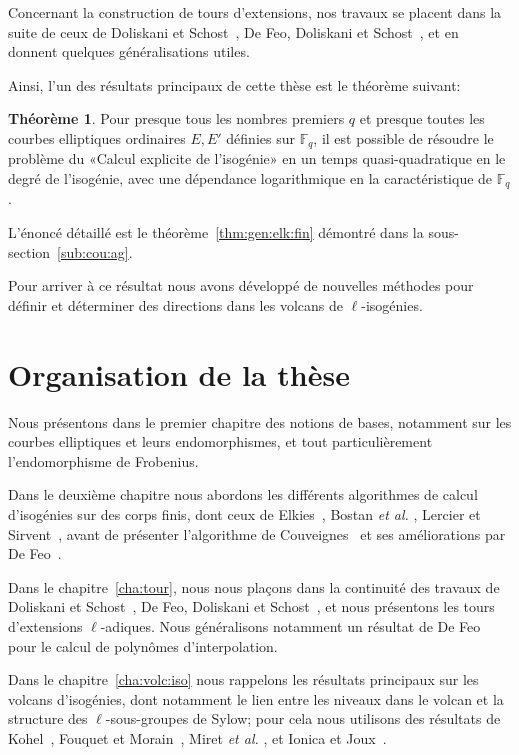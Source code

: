 \documentclass[10pt,a4paper]{book}
\theoremstyle{plain}
\theoremstyle{definition}
\newtheorem*{thm*}{Théorème}
\theoremstyle{definition}
\theoremstyle{definition}
\theoremstyle{definition}
\theoremstyle{definition}
\theoremstyle{remark}
\theoremstyle{remark}
\theoremstyle{definition}
\begin{document}
Concernant la construction de tours d'extensions, nos travaux se placent dans 
la suite de ceux de Doliskani et Schost~\cite{Doliskani-Schost15}, De Feo, 
Doliskani et Schost~\cite{DeFeo-Doliskani-Schost13}, et en donnent quelques 
généralisations utiles.

Ainsi, l'un des résultats principaux de cette thèse est le théorème suivant:
\begin{thm*}
Pour presque tous les nombres premiers $q$ et presque toutes les courbes 
elliptiques ordinaires $E,E'$ définies sur 
$\mathbb{F}_q$, il est possible de résoudre le problème du «Calcul explicite de
l'isogénie» en un temps quasi-quadratique en le degré de l'isogénie, 
avec une dépendance logarithmique en la caractéristique de $\mathbb{F}_q$.
\end{thm*}
L'énoncé détaillé est le théorème~\ref{thm:gen:elk:fin} démontré dans la 
sous-section~\ref{sub:cou:ag}.

Pour arriver à ce résultat nous avons développé de nouvelles méthodes pour 
définir et déterminer des directions dans les volcans de $\ell$-isogénies.

\section*{Organisation de la thèse}
Nous présentons dans le premier chapitre des notions de bases, notamment 
sur les courbes elliptiques et leurs endomorphismes, et tout particulièrement 
l'endomorphisme de Frobenius. 

Dans le deuxième chapitre nous abordons les différents algorithmes de calcul 
d'isogénies sur des corps finis, dont ceux de Elkies~\cite{Elkies1998}, Bostan 
\textit{et al.} \cite{BMSS08}, Lercier et Sirvent~\cite{Lercier-Sirvent2008}, avant de 
présenter l'algorithme de Couveignes~\cite{Couveignes96} et ses améliorations 
par De Feo~\cite{DeFeo11}. 

Dans le chapitre~\ref{cha:tour}, nous nous plaçons dans la continuité des 
travaux de Doliskani et Schost~\cite{Doliskani-Schost15}, De Feo, Doliskani et 
Schost~\cite{DeFeo-Doliskani-Schost13}, et nous présentons les tours 
d'extensions $\ell$-adiques. Nous généralisons notamment un résultat de De 
Feo~\cite{DeFeo11} pour le calcul de polynômes d'interpolation. 

Dans le chapitre~\ref{cha:volc:iso} nous rappelons les résultats principaux sur les volcans 
d'isogénies, dont notamment le lien entre les niveaux dans le
volcan et la structure des $\ell$-sous-groupes de Sylow; pour cela nous utilisons
des résultats de Kohel~\cite{Kohel96}, Fouquet et Morain~\cite{FouquetMorain02}, Miret \textit{et al.} \cite{MiretMRV05} \cite{MiretMSTV06} 
\cite{MiretMSTV08}, et Ionica et Joux~\cite{Ionica-Joux10}. 
\end{document}
